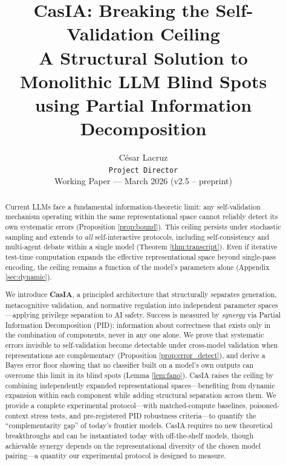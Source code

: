 \documentclass[11pt,a4paper]{article}
\title{%
  \textbf{CasIA: Breaking the Self-Validation Ceiling} \\[0.5em]
  \large A Structural Solution to Monolithic LLM Blind Spots \\
  using Partial Information Decomposition
}
\author{
  C\'esar Lacruz \\
  \texttt{Project Director} \\[0.3em]
  \small Working Paper --- March 2026 (v2.5 -- preprint)
}
\date{}
\theoremstyle{remark}
\begin{document}
\maketitle

\begin{abstract}
Current LLMs face a fundamental information-theoretic limit: any self-validation mechanism operating within the same representational space cannot reliably detect its own systematic errors (Proposition \ref{prop:bound}). This ceiling persists under stochastic sampling and extends to \emph{all} self-interactive protocols, including self-consistency and multi-agent debate within a single model (Theorem \ref{thm:transcript}). Even if iterative test-time computation expands the effective representational space beyond single-pass encoding, the ceiling remains a function of the model's parameters alone (Appendix \ref{sec:dynamic}).

We introduce \textbf{CasIA}, a principled architecture that structurally separates generation, metacognitive validation, and normative regulation into independent parameter spaces---applying privilege separation to AI safety. Success is measured by \emph{synergy} via Partial Information Decomposition (PID): information about correctness that exists only in the combination of components, never in any one alone. We prove that systematic errors invisible to self-validation become detectable under cross-model validation when representations are complementary (Proposition \ref{prop:error_detect}), and derive a Bayes error floor showing that no classifier built on a model's own outputs can overcome this limit in its blind spots (Lemma \ref{lem:fano}). CasIA raises the ceiling by combining independently expanded representational spaces---benefiting from dynamic expansion within each component while adding structural separation across them. We provide a complete experimental protocol---with matched-compute baselines, poisoned-context stress tests, and pre-registered PID robustness criteria---to quantify the ``complementarity gap'' of today's frontier models. CasIA requires no new theoretical breakthroughs and can be instantiated today with off-the-shelf models, though achievable synergy depends on the representational diversity of the chosen model pairing---a quantity our experimental protocol is designed to measure.
\end{abstract}
\end{document}
